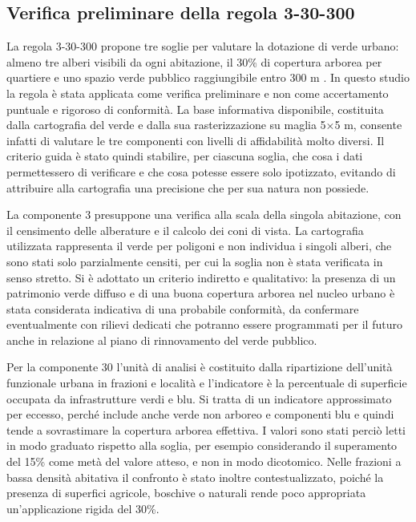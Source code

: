 \documentclass[
  a4paper,
]{book}
\begin{document}
\subsection{Verifica preliminare della regola 3-30-300}\label{verifica-preliminare-della-regola-3-30-300}

La regola 3-30-300 propone tre soglie per valutare la dotazione di verde urbano: almeno tre alberi visibili da ogni abitazione, il 30\% di copertura arborea per quartiere e uno spazio verde pubblico raggiungibile entro 300 m \citep{konijnendijk2023}.
In questo studio la regola è stata applicata come verifica preliminare e non come accertamento puntuale e rigoroso di conformità.
La base informativa disponibile, costituita dalla cartografia del verde e dalla sua rasterizzazione su maglia 5×5 m, consente infatti di valutare le tre componenti con livelli di affidabilità molto diversi.
Il criterio guida è stato quindi stabilire, per ciascuna soglia, che cosa i dati permettessero di verificare e che cosa potesse essere solo ipotizzato, evitando di attribuire alla cartografia una precisione che per sua natura non possiede.

La componente 3 presuppone una verifica alla scala della singola abitazione, con il censimento delle alberature e il calcolo dei coni di vista.
La cartografia utilizzata rappresenta il verde per poligoni e non individua i singoli alberi, che sono stati solo parzialmente censiti, per cui la soglia non è stata verificata in senso stretto.
Si è adottato un criterio indiretto e qualitativo: la presenza di un patrimonio verde diffuso e di una buona copertura arborea nel nucleo urbano è stata considerata indicativa di una probabile conformità, da confermare eventualmente con rilievi dedicati che potranno essere programmati per il futuro anche in relazione al piano di rinnovamento del verde pubblico.

Per la componente 30 l'unità di analisi è costituito dalla ripartizione dell'unità funzionale urbana in frazioni e località e l'indicatore è la percentuale di superficie occupata da infrastrutture verdi e blu.
Si tratta di un indicatore approssimato per eccesso, perché include anche verde non arboreo e componenti blu e quindi tende a sovrastimare la copertura arborea effettiva.
I valori sono stati perciò letti in modo graduato rispetto alla soglia, per esempio considerando il superamento del 15\% come metà del valore atteso, e non in modo dicotomico.
Nelle frazioni a bassa densità abitativa il confronto è stato inoltre contestualizzato, poiché la presenza di superfici agricole, boschive o naturali rende poco appropriata un'applicazione rigida del 30\%.
\end{document}
